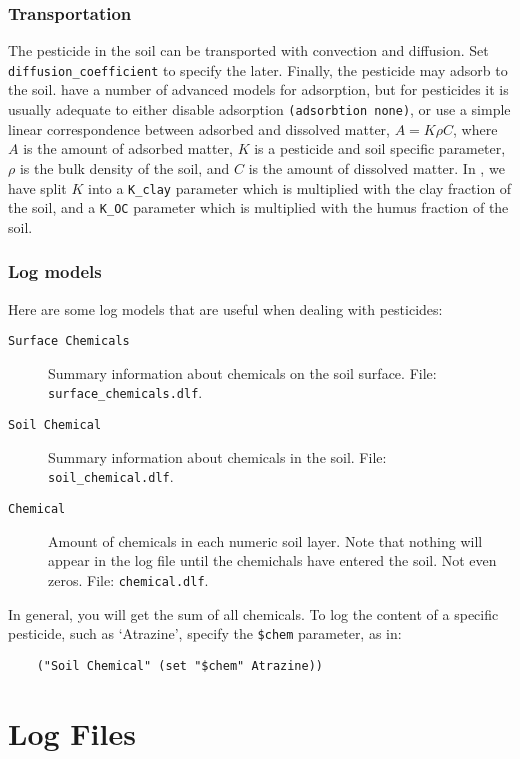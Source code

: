 \documentclass[a4paper,11pt]{article}
\begin{document}
\subsubsection{Transportation}

The pesticide in the soil can be transported with convection and
diffusion.  Set \texttt{diffusion\_coefficient} to specify the later.
Finally, the pesticide may adsorb to the soil.  \Daisy{} have a number
of advanced models for adsorption, but for pesticides it is usually
adequate to either disable adsorption \texttt{(adsorbtion none)}, or
use a simple linear correspondence between adsorbed and dissolved
matter, $A = K \rho C$, where $A$ is the amount of adsorbed matter,
$K$ is a pesticide and soil specific parameter, $\rho$ is the bulk
density of the soil, and $C$ is the amount of dissolved matter.  In
\daisy{}, we have split $K$ into a \texttt{K\_clay} parameter which is
multiplied with the clay fraction of the soil, and a \texttt{K\_OC}
parameter which is multiplied with the humus fraction of the soil.


\subsubsection{Log models}

Here are some log models that are useful when dealing with pesticides:
\begin{description}
\item[\texttt{Surface Chemicals}] Summary information about chemicals
  on the soil surface. File: \texttt{surface\_chemicals.dlf}.
\item[\texttt{Soil Chemical}] Summary information about chemicals in
  the soil.  File: \texttt{soil\_chemical.dlf}. 
\item[\texttt{Chemical}] Amount of chemicals in each numeric soil
  layer.  Note that nothing will appear in the log file until the
  chemichals have entered the soil.  Not even zeros.  File:
  \texttt{chemical.dlf}.
\end{description}

In general, you will get the sum of all chemicals.  To log the content
of a specific pesticide, such as `Atrazine', specify the \verb|$chem|%
parameter, as in:
\begin{verbatim}
    ("Soil Chemical" (set "$chem" Atrazine))
\end{verbatim}%

\section{Log Files}
\label{sec:output}
\end{document}
